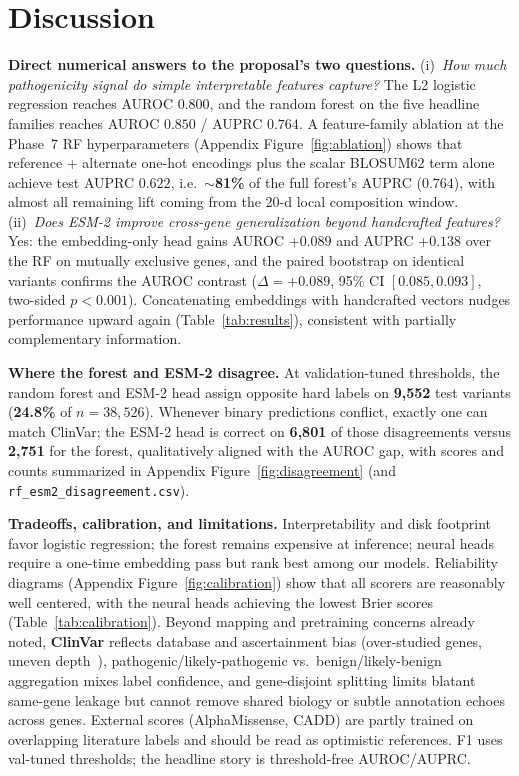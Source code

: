 \documentclass[11pt,letterpaper]{article}
\begin{document}
\section*{Discussion}

\textbf{Direct numerical answers to the proposal's two questions.}
(i)~\emph{How much pathogenicity signal do simple interpretable features capture?} The L2 logistic regression reaches AUROC $0.800$, and the random forest on the five headline families reaches AUROC $0.850$ / AUPRC $0.764$. A feature-family ablation at the Phase~7 RF hyperparameters (Appendix Figure~\ref{fig:ablation}) shows that reference + alternate one-hot encodings plus the scalar BLOSUM62 term alone achieve test AUPRC $0.622$, i.e.\ \textbf{$\sim$81\%} of the full forest's AUPRC ($0.764$), with almost all remaining lift coming from the 20-d local composition window. (ii)~\emph{Does ESM-2 improve cross-gene generalization beyond handcrafted features?} Yes: the embedding-only head gains AUROC +$0.089$ and AUPRC +$0.138$ over the RF on mutually exclusive genes, and the paired bootstrap on identical variants confirms the AUROC contrast ($\Delta = +0.089$, 95\% CI $[0.085, 0.093]$, two-sided $p < 0.001$). Concatenating embeddings with handcrafted vectors nudges performance upward again (Table~\ref{tab:results}), consistent with partially complementary information.

\textbf{Where the forest and ESM-2 disagree.} At validation-tuned thresholds, the random forest and ESM-2 head assign opposite hard labels on \textbf{9{,}552} test variants (\textbf{24.8\%} of $n=38{,}526$). Whenever binary predictions conflict, exactly one can match ClinVar; the ESM-2 head is correct on \textbf{6{,}801} of those disagreements versus \textbf{2{,}751} for the forest, qualitatively aligned with the AUROC gap, with scores and counts summarized in Appendix Figure~\ref{fig:disagreement} (and \texttt{rf\_esm2\_disagreement.csv}).

\textbf{Tradeoffs, calibration, and limitations.}
Interpretability and disk footprint favor logistic regression; the forest remains expensive at inference; neural heads require a one-time embedding pass but rank best among our models. Reliability diagrams (Appendix Figure~\ref{fig:calibration}) show that all scorers are reasonably well centered, with the neural heads achieving the lowest Brier scores (Table~\ref{tab:calibration}). Beyond mapping and pretraining concerns already noted, \textbf{ClinVar} reflects database and ascertainment bias (over-studied genes, uneven depth~\citep{landrum2020clinvar}), pathogenic/likely-pathogenic vs.\ benign/likely-benign aggregation mixes label confidence, and gene-disjoint splitting limits blatant same-gene leakage but cannot remove shared biology or subtle annotation echoes across genes. External scores (AlphaMissense, CADD) are partly trained on overlapping literature labels and should be read as optimistic references. F1 uses val-tuned thresholds; the headline story is threshold-free AUROC/AUPRC.
\end{document}
